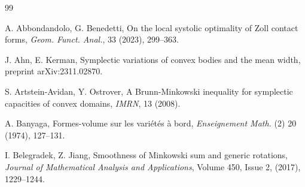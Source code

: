 \documentclass[12pt]{amsart}
\theoremstyle{definition}
\begin{document}
\begin{thebibliography} {99}


 A. Abbondandolo, G. Benedetti, On the local systolic optimality of Zoll contact forms, {\em Geom. Funct. Anal.}, 33 (2023), 299--363.


 J. Ahn, E. Kerman, Symplectic variations of convex bodies and the mean width, preprint arXiv:2311.02870.





 S. Artstein-Avidan, Y. Ostrover, A Brunn-Minkowski inequality for symplectic capacities of convex domains, {\em IMRN}, 13 (2008).






 A. Banyaga, Formes-volume sur les vari\'{e}t\'{e}s \`{a} bord, {\em Enseignement Math.} (2) 20 (1974), 127--131.




 I. Belegradek, Z. Jiang,
Smoothness of Minkowski sum and generic rotations,
{\em Journal of Mathematical Analysis and Applications},
Volume 450, Issue 2,
(2017), 1229--1244.




\end{thebibliography}
\end{document}
